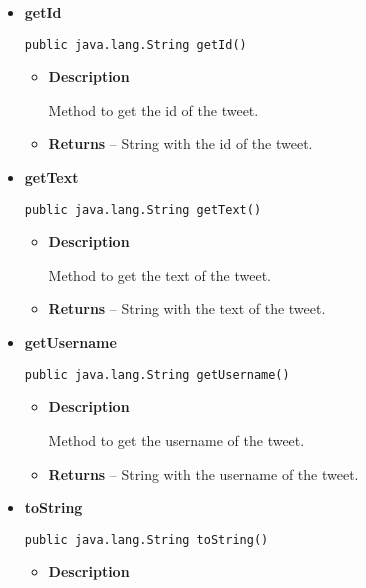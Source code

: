 {{{{{{{{\begin{itemize}
{\begin{itemize}
{Method to get the hash of the tweet.
}
\item{{\bf  Returns} -- 
String with the hash of the tweet. 
}%
\end{itemize}
}%
\item{ 
\hypertarget{com.jmorenov.tweetsccore.twitter.Tweet.getId()}{{\bf  getId}\\}
\begin{lstlisting}[frame=none]
public java.lang.String getId()\end{lstlisting} %
\begin{itemize}
\item{
{\bf  Description}

Method to get the id of the tweet.
}
\item{{\bf  Returns} -- 
String with the id of the tweet. 
}%
\end{itemize}
}%
\item{ 
\hypertarget{com.jmorenov.tweetsccore.twitter.Tweet.getText()}{{\bf  getText}\\}
\begin{lstlisting}[frame=none]
public java.lang.String getText()\end{lstlisting} %
\begin{itemize}
\item{
{\bf  Description}

Method to get the text of the tweet.
}
\item{{\bf  Returns} -- 
String with the text of the tweet. 
}%
\end{itemize}
}%
\item{ 
\hypertarget{com.jmorenov.tweetsccore.twitter.Tweet.getUsername()}{{\bf  getUsername}\\}
\begin{lstlisting}[frame=none]
public java.lang.String getUsername()\end{lstlisting} %
\begin{itemize}
\item{
{\bf  Description}

Method to get the username of the tweet.
}
\item{{\bf  Returns} -- 
String with the username of the tweet. 
}%
\end{itemize}
}%
\item{ 
\hypertarget{com.jmorenov.tweetsccore.twitter.Tweet.toString()}{{\bf  toString}\\}
\begin{lstlisting}[frame=none]
public java.lang.String toString()\end{lstlisting} %
\begin{itemize}
\item{
{\bf  Description}

}
\end{itemize}}
\end{itemize}}}}}}}}}
